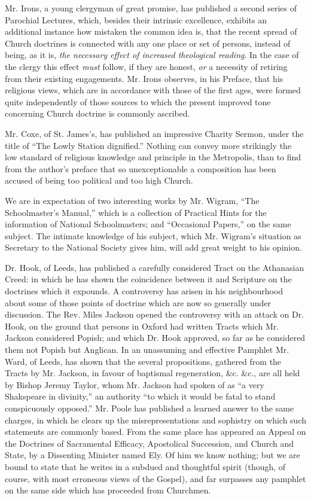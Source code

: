 Mr. Irons, a young clergyman of great promise, has
published a second series of Parochial Lectures, which, besides their
intrinsic excellence, exhibits an additional instance how mistaken the
common idea is, that the recent spread of Church doctrines is connected
with any one place or set of persons, instead of being, as it is, \emph{the
necessary effect of increased theological reading}. In the case of
the clergy this effect \emph{must} follow, if they are honest, \emph{or}
a necessity of retiring from their existing engagements. Mr. Irons
observes, in his Preface, that his religious views, which are in
accordance with those of the first ages, were formed quite independently
of those sources to which the present improved tone concerning Church
doctrine is commonly ascribed.

Mr. Coxe, of St. James's, has published an
impressive Charity Sermon, under the title of ``The Lowly Station
dignified.'' Nothing can convey more strikingly the low standard of
religious knowledge and principle in the Metropolis, than to find from
the author's preface that so unexceptionable a composition has been
accused of being too political and too high Church.

We are in expectation of two interesting works by
Mr. Wigram, ``The Schoolmaster's Manual,'' which is a collection of
Practical Hints for the information of National Schoolmasters; and ``Occasional
Papers,'' on the same subject. The intimate knowledge of his subject,
which Mr. Wigram's situation as Secretary to the National Society gives
him, will add great weight to his opinion.

Dr. Hook, of Leeds, has published a carefully
considered Tract on the Athanasian Creed: in which he has shown the
coincidence between it and Scripture on the doctrines which it expounds.
A controversy has arisen in his neighbourhood about some of those points
of doctrine which are now so generally under discussion. The Rev. Miles
Jackson opened the controversy with an attack on Dr. Hook, on the ground
that persons in Oxford had written Tracts which Mr. Jackson considered
Popish; and which Dr. Hook approved, so far as he considered them not
Popish but Anglican. In an unassuming and effective Pamphlet Mr. Ward,
of Leeds, has shown that the several propositions, gathered from the
Tracts by Mr. Jackson, in favour of baptismal regeneration, \&c.
\&c., are all held by Bishop Jeremy Taylor, whom Mr. Jackson had
spoken of as ``a very Shakspeare in divinity,'' an authority ``to which it
would be fatal to stand conspicuously opposed.'' Mr. Poole has published
a learned answer to the same charges, in which he clears up the
misrepresentations and sophistry on which such statements are commonly
based. From the same place has appeared an Appeal on the Doctrines of
Sacramental Efficacy, Apostolical Succession, and Church and State, by a
Dissenting Minister named Ely. Of him we know nothing; but we are bound
to state that he writes in a subdued and thoughtful spirit (though, of
course, with most erroneous views of the Gospel), and far surpasses any
pamphlet on the same side which has proceeded from Churchmen.

